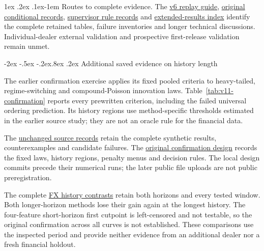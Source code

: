 \documentclass[10pt,a4paper]{article}
\makeatletter
\renewcommand\section{\@startsection{section}{1}{\z@}%
  {-2ex \@plus -.5ex \@minus -.2ex}{.8ex \@plus .2ex}%
  {\normalfont\large\bfseries}}
\renewcommand\paragraph{\@startsection{paragraph}{4}{\z@}%
  {1ex \@plus .2ex \@minus .1ex}{-1em}%
  {\normalfont\normalsize\bfseries}}
\makeatother
\begin{document}
\paragraph{Routes to complete evidence.}
The \href{https://github.com/ByronLi0207/financial-mathematics-paper-20261020/blob/revision-v7-final/protocol/revision-v6/REPLAY.md}{v6 replay guide},
\href{https://github.com/ByronLi0207/financial-mathematics-paper-20261020/blob/revision-v7-final/results/revision-20261022/README.md}{original conditional records},
\href{https://github.com/ByronLi0207/financial-mathematics-paper-20261020/blob/revision-v7-final/results/supervisor-20261023/r6/README.md}{supervisor rule records} and
\href{https://github.com/ByronLi0207/financial-mathematics-paper-20261020/blob/revision-v7-final/EXTENDED_RESULTS.md}{extended-results index} identify the
complete retained tables, failure inventories and longer technical discussions.
Individual-dealer external validation and prospective first-release validation remain unmet.

\FloatBarrier

\section{Additional saved evidence on history length}\label{sup:v11-history}

The earlier confirmation exercise applies its fixed pooled criteria to heavy-tailed, regime-switching and compound-Poisson innovation laws. Table~\ref{tab:v11-confirmation} reports every prewritten criterion, including the failed universal ordering prediction. Its history regions use method-specific thresholds estimated in the earlier source study; they are not an oracle rule for the financial data.



The \href{https://github.com/ByronLi0207/financial-mathematics-paper-20261020/tree/revision-v11/evidence/v11/pr5-v9}{unchanged source records} retain the complete synthetic results, counterexamples and candidate failures. The \href{https://github.com/ByronLi0207/financial-mathematics-paper-20261020/blob/revision-v11/evidence/v11/pr5-v9/protocol/revision-v9/wp2-confirmatory.md}{original confirmation design} records the fixed laws, history regions, penalty menus and decision rules. The local design commits precede their numerical runs; the later public file uploads are not public preregistration.

The complete \href{https://github.com/ByronLi0207/financial-mathematics-paper-20261020/blob/revision-v11/evidence/v11/pr5-v9/results/revision-v9/wp3/contrasts.json}{FX history contrasts} retain both horizons and every tested window. Both longer-horizon methods lose their gain again at the longest history. The four-feature short-horizon first cutpoint is left-censored and not testable, so the original confirmation across all curves is not established. These comparisons use the inspected period and provide neither evidence from an additional dealer nor a fresh financial holdout.
\end{document}
